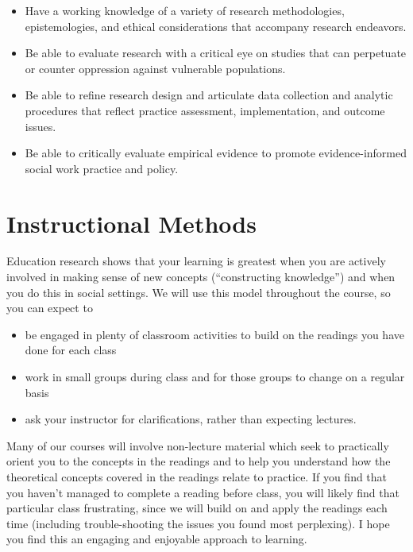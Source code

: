 \documentclass[11pt,]{article}
\providecommand{\tightlist}{%
  \setlength{\itemsep}{0pt}\setlength{\parskip}{0pt}}
\begin{document}
\begin{itemize}
\tightlist
\item
  Have a working knowledge of a variety of research methodologies,
  epistemologies, and ethical considerations that accompany research
  endeavors.
\item
  Be able to evaluate research with a critical eye on studies that can
  perpetuate or counter oppression against vulnerable populations.
\item
  Be able to refine research design and articulate data collection and
  analytic procedures that reflect practice assessment, implementation,
  and outcome issues.
\item
  Be able to critically evaluate empirical evidence to promote
  evidence-informed social work practice and policy.
\end{itemize}

\section{Instructional Methods}\label{instructional-methods}

Education research shows that your learning is greatest when you are
actively involved in making sense of new concepts (``constructing
knowledge'') and when you do this in social settings. We will use this
model throughout the course, so you can expect to

\begin{itemize}
\tightlist
\item
  be engaged in plenty of classroom activities to build on the readings
  you have done for each class
\item
  work in small groups during class and for those groups to change on a
  regular basis
\item
  ask your instructor for clarifications, rather than expecting
  lectures.
\end{itemize}

Many of our courses will involve non-lecture material which seek to
practically orient you to the concepts in the readings and to help you
understand how the theoretical concepts covered in the readings relate
to practice. If you find that you haven't managed to complete a reading
before class, you will likely find that particular class frustrating,
since we will build on and apply the readings each time (including
trouble-shooting the issues you found most perplexing). I hope you find
this an engaging and enjoyable approach to learning.
\end{document}
